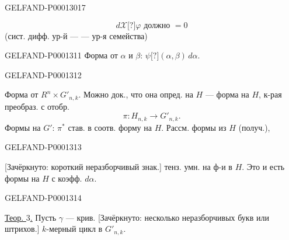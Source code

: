 \begin{GelfandAdjacentEvidence}{GELFAND-P000130}{17}

\begin{equation*}d\mathcal X\text{[?]}\varphi\text{ должно }=0\end{equation*}
(сист. дифф. ур-й ---
--- ур-я семейства)
\end{GelfandAdjacentEvidence}



\begin{GelfandAdjacentEvidence}{GELFAND-P000131}{1}
Форма от $\alpha$ и $\beta$: $\psi\text{[?]}(\alpha,\beta)\,d\alpha$.
\end{GelfandAdjacentEvidence}
\begin{GelfandAdjacentEvidence}{GELFAND-P000131}{2}

Форма от $R^n\times G'_{n,k}$. Можно док., что она опред. на $H$ — форма на $H$, к-рая преобраз. с отобр.
\begin{equation*}\pi:H_{n,k}\longrightarrow G'_{n,k}.\end{equation*}
Формы на $G'$: $\pi^*$ став. в соотв. форму на $H$. Рассм. формы из $H$ (получ.),
\end{GelfandAdjacentEvidence}
\begin{GelfandAdjacentEvidence}{GELFAND-P000131}{3}

[Зачёркнуто: короткий неразборчивый знак.] тенз. умн. на ф-и в $H$. Это и есть формы на $H$ с коэфф. $d\alpha$.
\end{GelfandAdjacentEvidence}
\begin{GelfandAdjacentEvidence}{GELFAND-P000131}{4}


\underline{Теор. $3$.} Пусть $\gamma$ — крив. [Зачёркнуто: несколько неразборчивых букв или штрихов.] $k$-мерный цикл в $G'_{n,k}$.
\end{GelfandAdjacentEvidence}
